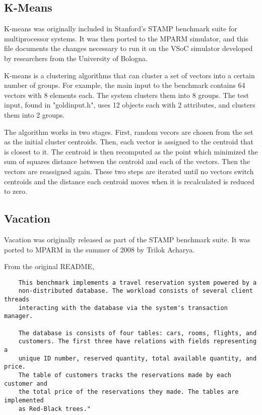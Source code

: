\documentclass{article}
\begin{document}
\subsection{K-Means}

K-means was originally included in Stanford's STAMP benchmark suite for 
multiprocessor systems.  It was then ported to the MPARM simulator, and this
file documents the changes necessary to run it on the VSoC simulator developed
by researchers from the University of Bologna. 

K-means is a clustering algorithms that can cluster a set of vectors into a 
certain number of groups.  For example, the main input to the benchmark
contains 64 vectors with 8 elements each. The system clusters them into 8
groups.  The test input, found in "goldinput.h", uses 12 objects each with 
2 attributes, and clusters them into 2 groups. 

The algorithm works in two stages. First, random vecors are chosen from the
set as the initial cluster centroids. Then, each vector is assigned to the 
centroid that is closest to it. The centroid is then recomputed as the point
which minimized the sum of squares distance between the centroid and each of 
the vectors. Then the vectors are reassigned again. These two steps are
iterated until no vectors switch centroids and the distance each centroid moves
when it is recalculated is reduced to zero. 

\subsection{Vacation}

Vacation was originally released as part of the STAMP benchmark suite. It was
ported to MPARM in the summer of 2008 by Trilok Acharya.

From the original README, 

\begin{verbatim}
    This benchmark implements a travel reservation system powered by a
    non-distributed database. The workload consists of several client threads
    interacting with the database via the system's transaction manager.

    The database is consists of four tables: cars, rooms, flights, and 
    customers. The first three have relations with fields representing a 
    unique ID number, reserved quantity, total available quantity, and price. 
    The table of customers tracks the reservations made by each customer and 
    the total price of the reservations they made. The tables are implemented 
    as Red-Black trees."
\end{verbatim}
\end{document}
